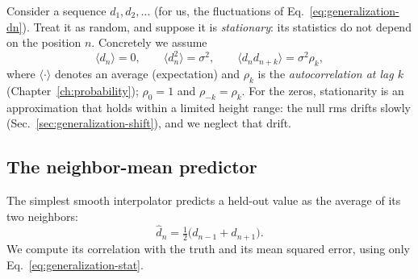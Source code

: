 Consider a sequence $d_1,d_2,\dots$ (for us, the fluctuations of Eq.~\eqref{eq:generalization-dn}). Treat it as random, and suppose it is \emph{stationary}: its statistics do not depend on the position $n$. Concretely we assume
\begin{equation}
\langle d_n\rangle=0,\qquad \langle d_n^2\rangle=\sigma^2,\qquad \langle d_nd_{n+k}\rangle=\sigma^2\rho_k,
\label{eq:generalization-stat}
\end{equation}
where $\langle\cdot\rangle$ denotes an average (expectation) and $\rho_k$ is the \emph{autocorrelation at lag $k$} (Chapter~\ref{ch:probability}); $\rho_0=1$ and $\rho_{-k}=\rho_k$. For the zeros, stationarity is an approximation that holds within a limited height range: the null rms drifts slowly (Sec.~\ref{sec:generalization-shift}), and we neglect that drift.

\subsection{The neighbor-mean predictor}

The simplest smooth interpolator predicts a held-out value as the average of its two neighbors:
\begin{equation}
\hat d_n=\tfrac12\bigl(d_{n-1}+d_{n+1}\bigr).
\label{eq:generalization-nbr}
\end{equation}
We compute its correlation with the truth and its mean squared error, using only Eq.~\eqref{eq:generalization-stat}.

